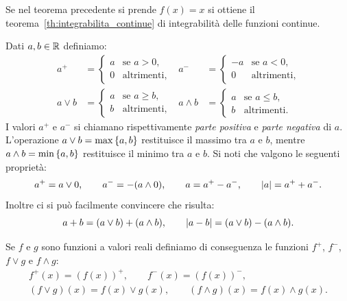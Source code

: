 \begin{remark}
Se nel teorema precedente si prende $f(x)=x$ si ottiene 
il teorema~\ref{th:integrabilita_continue} di integrabilità delle funzioni continue.
\end{remark}

Dati $a,b\in {\mathbb R}$ definiamo:
\begin{align*}
  a^+ &= \begin{cases}
    a & \text{se $a>0$,}\\
    0 & \text{altrimenti,}
  \end{cases} &
  a^- &= \begin{cases}
    -a & \text{se $a<0$,}\\
    0 & \text{altrimenti,}
  \end{cases} \\
  a \vee b &= \begin{cases}
    a & \text{se $a\ge b$,}\\
    b & \text{altrimenti,}
  \end{cases} &
  a \wedge b &= \begin{cases}
    a & \text{se $a\le b$,}\\
    b & \text{altrimenti.}
  \end{cases}
\end{align*}
I valori $a^+$ e $a^-$ si chiamano rispettivamente 
\emph{parte positiva} e \emph{parte negativa} di $a$.
L'operazione $a\vee b = \max{\left\{ a,b \right\}}$ restituisce il massimo tra $a$ e $b$,
mentre $a\wedge b = \min{\left\{ a,b \right\}}$ restituisce il minimo tra $a$ e $b$.
Si noti che valgono le seguenti proprietà:
\[
   a^+ = a \vee 0, \qquad
   a^- = -(a \wedge 0), \qquad
   a = a^+ - a^-, \qquad
   {\left|a\right|} = a^+ + a^-.
\]
Inoltre ci si può facilmente convincere che risulta:
\[
  a + b = (a \vee b) + (a \wedge b), \qquad
  {\left|a-b\right|} = (a \vee b) - (a \wedge b).
\]

Se $f$ e $g$ sono funzioni a valori reali definiamo 
di conseguenza le funzioni $f^+$, $f^-$, $f\vee g$ e $f\wedge g$:
\begin{gather*}
  f^+(x) = (f(x))^+, \qquad
  f^-(x) = (f(x))^-, \\
  (f\vee g)(x) = f(x) \vee g(x), \qquad
  (f\wedge g)(x) = f(x) \wedge g(x).
\end{gather*}

